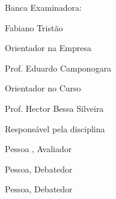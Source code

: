 
%
% 
%
\begin{folhadeaprovacao}


\thispagestyle{empty}

{\large Banca Examinadora:}

\vspace{1.3cm}

\begin{flushright}

{\large Fabiano Tristão}

{\large Orientador na Empresa}

\vspace{1.2cm}
{\large Prof. Eduardo Camponogara}

{\large Orientador no Curso}

\vspace{1.2cm}
 
{\large Prof. Hector Bessa Silveira}

{\large Responsável pela disciplina}

\vspace{1cm}

{\large Pessoa , Avaliador}

\vspace{0.8cm}

{\large Pessoa, Debatedor}

\vspace{0.8cm}

{\large Pessoa, Debatedor}

\end{flushright}
  
\end{folhadeaprovacao}